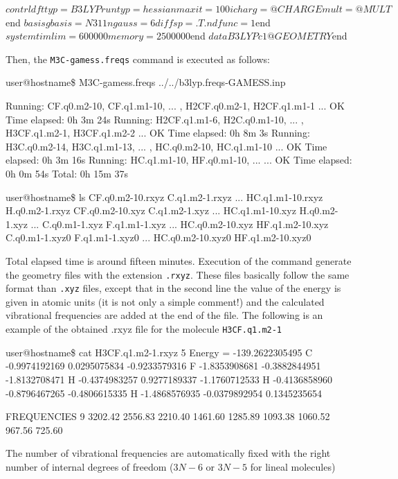 \documentclass[a4paper,12pt]{article}
\begin{document}
\begin{bifile}[caption=\footnotesize GAMESS template for frequency calculations at B3LYP level (b3lyp.freqs-GAMESS.inp)]
 $contrl dfttyp=B3LYP runtyp=hessian
  maxit=100 icharg=@CHARGE mult=@MULT $end
 $basis gbasis=N311 ngauss=6 diffsp=.T. ndfunc=1 $end
 $system timlim=600000 memory=2500000 $end
 $data
 B3LYP
 c1
 @GEOMETRY
 $end
\end{bifile}
Then, the \texttt{M3C-gamess.freqs} command is executed as follows:
\begin{shellexec}
user@hostname\$ M3C-gamess.freqs ../../b3lyp.freqs-GAMESS.inp

Running:   CF.q0.m2-10,  CF.q1.m1-10,  ... , H2CF.q0.m2-1, H2CF.q1.m1-1 ... OK   Time elapsed: 0h  3m 24s
Running:  H2CF.q1.m1-6, H2C.q0.m1-10,  ... , H3CF.q1.m2-1, H3CF.q1.m2-2 ... OK   Time elapsed: 0h  8m  3s
Running:  H3C.q0.m2-14, H3C.q1.m1-13,  ... ,  HC.q0.m2-10,  HC.q1.m1-10 ... OK   Time elapsed: 0h  3m 16s
Running:   HC.q1.m1-10,  HF.q0.m1-10,  ...                              ... OK   Time elapsed: 0h  0m 54s
                                                                                        Total: 0h 15m 37s
                                                                                        
user@hostname\$ ls
CF.q0.m2-10.rxyz  C.q1.m2-1.rxyz     ...    HC.q1.m1-10.rxyz  H.q0.m2-1.rxyz
CF.q0.m2-10.xyz   C.q1.m2-1.xyz      ...    HC.q1.m1-10.xyz   H.q0.m2-1.xyz
...
C.q0.m1-1.xyz     F.q1.m1-1.xyz      ...    HC.q0.m2-10.xyz    HF.q1.m2-10.xyz
C.q0.m1-1.xyz0    F.q1.m1-1.xyz0     ...    HC.q0.m2-10.xyz0   HF.q1.m2-10.xyz0
\end{shellexec}
Total elapsed time is around fifteen minutes. Execution of the command generate the geometry files with the extension 
\texttt{.rxyz}.
These files basically follow the same format than \texttt{.xyz} files, except that in the second line the value of the 
energy is given in atomic units (it is not only a simple comment!) and the calculated vibrational frequencies are added at 
the end of the file. The following is an example of the obtained .rxyz file for the molecule \texttt{H3CF.q1.m2-1}

\vspace{1.1cm}
\begin{shellexec}
user@hostname\$ cat H3CF.q1.m2-1.rxyz
5
Energy = -139.2622305495
C   -0.9974192169   0.0295075834   -0.9233579316
F   -1.8353908681   -0.3882844951   -1.8132708471
H   -0.4374983257   0.9277189337   -1.1760712533
H   -0.4136858960   -0.8796467265   -0.4806615335
H   -1.4868576935   -0.0379892954   0.1345235654

FREQUENCIES    9
3202.42
2556.83
2210.40
1461.60
1285.89
1093.38
1060.52
967.56
725.60
\end{shellexec}
The number of vibrational frequencies are automatically fixed with the right number of internal degrees of freedom
($3N-6$ or $3N-5$ for lineal molecules)
\end{document}
